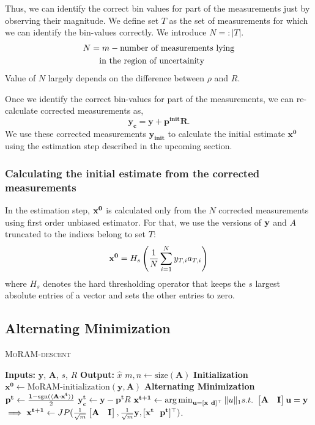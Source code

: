 Thus, we can identify the correct bin values for part of the measurements just by observing their magnitude. We define set $T$ as the set of measurements for which we can identify the bin-values correctly. We introduce $N=:|T|$.
\begin{align*}
N & =  m - \textnormal{number of measurements lying} \\
&~~~\textnormal{in the region of uncertainity}
\end{align*}
Value of $N$ largely depends on the difference between $\rho$ and $R$.

Once we identify the correct bin-values for part of the measurements, we can re-calculate corrected measurements as,
$$
\mathbf{y_{c} = y + p^{init}R}.
$$
We use these corrected measurements $\mathbf{y_{init}}$ to calculate the initial estimate $\mathbf{{x}^0}$ using the estimation step described in the upcoming section.
\subsubsection{Calculating the initial estimate from the corrected measurements}
In the estimation step, $\mathbf{x^0}$ is calculated only from the $N$ corrected measurements using first order unbiased estimator. For that, we use the versions of $\mathbf{y}$ and $A$ truncated to the indices belong to set $T$:
\begin{equation}
\mb{x^0} = H_s\left( \frac{1}{N}\sum_{i=1}^{N}y_{T,i}a_{T,i}\right)
\label{eq:init}
\end{equation}
where $H_s$ denotes the hard thresholding operator that keeps the $s$ largest absolute entries of a vector and sets the other entries to zero.
\subsection{Alternating Minimization}
\label{sec:altmin}
\begin{algorithm}[H]
	\caption{\textsc{MoRAM-descent}}
	\label{alg:MoRAM}
	\begin{algorithmic}
		\State\textbf{Inputs:} $\mathbf{y}$, $\mathbf{A}$, $s$, $R$
		\State\textbf{Output:}  $\widehat{x}$
		\State $m,n \leftarrow \mathrm{size}(\mathbf{A})$ 
		\State \textbf{Initialization}
		\State $\mathbf{x^0} \leftarrow \textrm{MoRAM-initialization}(\mathbf{y, A})$ 
		\State \textbf{Alternating Minimization}
		\State $\mathbf{{p}^{t}} \leftarrow \frac{\mathbf{1}-\mathrm{sgn}(\langle \mathbf{A} \cdot \mathbf{x^t} \rangle)}{2}$
		\State $\mathbf{y^t_c} \leftarrow \mathbf{y} - \mathbf{p^t}R$
		\State $\mathbf{{x}^{t+1}}\leftarrow \operatorname*{arg\,min}_{\mathbf{u}=[\mathbf{x~d}]^\top}\|u\|_1  s.t.~ \begin{bmatrix} \mathbf{A} & \mathbf{I} \end{bmatrix}\mathbf{u} = \mathbf{y}$ 
		\State $\implies \mathbf{{x}^{t+1}}\leftarrow \small{JP(\frac{1}{\sqrt{m}}\begin{bmatrix} \mathbf{A} & \mathbf{I} \end{bmatrix},\frac{1}{\sqrt{m}}\mathbf{y},[\mathbf{x^t~~p^t}]^\t)}$.
		\EndFor
	\end{algorithmic}
\end{algorithm}



